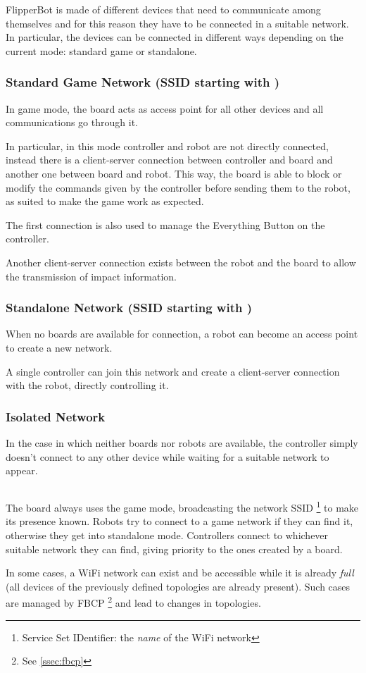 FlipperBot is made of different devices that need to communicate
among themselves and for this reason they have to be connected in a
suitable network. In particular, the devices can be connected in
different ways depending on the current mode: standard game or
standalone.

\subsubsection{Standard Game Network (SSID starting with
  )}
  \begin{figure}
    
  \end{figure}
  In game mode, the board acts as access point for all other devices
  and all communications go through it.

  In particular, in this mode controller and robot are not directly
  connected, instead there is a client-server connection between
  controller and board and another one between board and robot. This
  way, the board is able to block or modify the commands given by
  the controller before sending them to the robot, as suited to make
  the game work as expected.

  The first connection is also used to manage the Everything Button
  on the controller.

  Another client-server connection exists between the robot and the
  board to allow the transmission of impact information.

\subsubsection{Standalone Network (SSID starting with
  )}
  When no boards are available for connection, a robot can become an
  access point to create a new network.

  A single controller can join this network and create a
  client-server connection with the robot, directly controlling it.

\subsubsection{Isolated Network}
  In the case in which neither boards nor robots are available, the
  controller simply doesn't connect to any other device while
  waiting for a suitable network to appear.

\subsection*{}
The board always uses the game mode, broadcasting the network SSID%
\footnote{Service Set IDentifier: the \textit{name} of the WiFi
network} to make its presence known. Robots try to connect to a game
network if they can find it, otherwise they get into standalone
mode. Controllers connect to whichever suitable network they can
find, giving priority to the ones created by a board.

In some cases, a WiFi network can exist and be accessible while it
is already \textit{full} (all devices of the previously defined
topologies are already present). Such cases are managed by FBCP%
\footnote{See \ref{ssec:fbcp}} and lead to changes in topologies.


